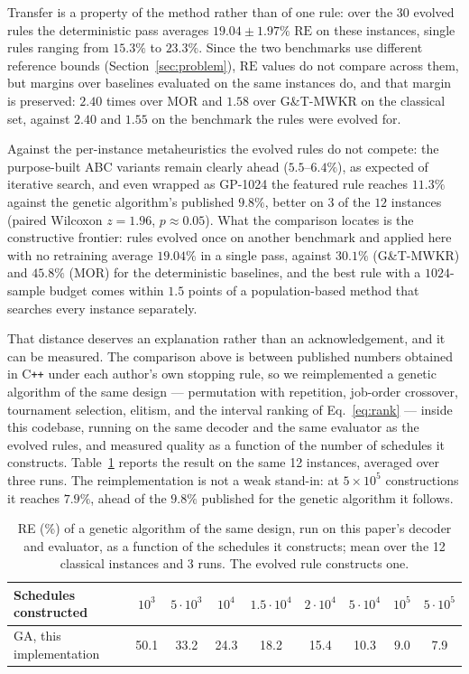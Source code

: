 \documentclass[review,authoryear,11pt]{elsarticle}
\newcommand{\rev}[1]{\textcolor{revcolor}{#1}}
\newcommand{\RE}{\mathrm{RE}}
\begin{document}
Transfer is a property of the method rather than of one rule: over the
30 evolved rules the deterministic pass averages $19.04 \pm 1.97\%$
$\RE$ on these instances, single rules ranging from $15.3\%$ to
$23.3\%$. Since the two benchmarks use different reference bounds
(Section~\ref{sec:problem}), $\RE$ values do not compare across them,
but margins over baselines evaluated on the same instances do, and that
margin is preserved: $2.40$ times over MOR and $1.58$ over G\&T-MWKR on
the classical set, against $2.40$ and $1.55$ on the benchmark the rules
were evolved for.

Against the per-instance metaheuristics the evolved rules do not
compete: the purpose-built ABC variants remain clearly ahead
($5.5$--$6.4\%$), as expected of iterative search, and even wrapped as
GP-1024 the featured rule reaches $11.3\%$ against the genetic
algorithm's published $9.8\%$, better on $3$ of the $12$ instances
(paired Wilcoxon $z = 1.96$, $p \approx 0.05$). What the comparison
locates is the constructive frontier: rules evolved once on another
benchmark and applied here with no retraining average $19.04\%$ in a
single pass, against $30.1\%$ (G\&T-MWKR) and $45.8\%$ (MOR) for the
deterministic baselines, and the best rule with a $1024$-sample budget
comes within $1.5$ points of a population-based method that searches
every instance separately.

\rev{That distance deserves an explanation rather than an
acknowledgement, and it can be measured. The comparison above is
between published numbers obtained in C\texttt{++} under each author's
own stopping rule, so we reimplemented a genetic algorithm of the same
design --- permutation with repetition, job-order crossover, tournament
selection, elitism, and the interval ranking of
Eq.~\eqref{eq:rank} --- inside this codebase, running on the same
decoder and the same evaluator as the evolved rules, and measured
quality as a function of the number of schedules it constructs.
Table~\ref{tab:gapbudget} reports the result on the same 12 instances,
averaged over three runs. The reimplementation is not a weak stand-in:
at $5\times10^{5}$ constructions it reaches $7.9\%$, ahead of the
$9.8\%$ published for the genetic algorithm it follows.}

\begin{table}[t]
\centering\small
\color{revcolor}
\caption{\rev{RE (\%) of a genetic algorithm of the same design, run on
this paper's decoder and evaluator, as a function of the schedules it
constructs; mean over the 12 classical instances and 3 runs. The
evolved rule constructs one.}}
\label{tab:gapbudget}
\setlength{\tabcolsep}{4pt}
\begin{tabular}{lcccccccc}
\toprule
Schedules constructed & $10^3$ & $5{\cdot}10^3$ & $10^4$ &
$1.5{\cdot}10^4$ & $2{\cdot}10^4$ & $5{\cdot}10^4$ & $10^5$ &
$5{\cdot}10^5$ \\
\midrule
GA, this implementation & 50.1 & 33.2 & 24.3 & 18.2 & 15.4 & 10.3 & 9.0
& 7.9 \\
\bottomrule
\end{tabular}
\end{table}
\end{document}
